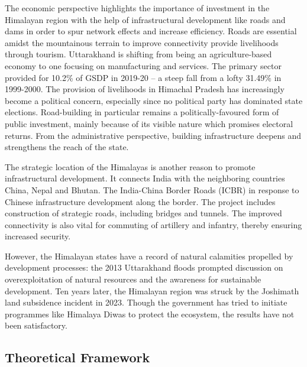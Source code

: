 \documentclass[doublespace,times,Afour,review]{template/sagej}
\begin{document}
The economic perspective highlights the importance of investment in the Himalayan region with the help of infrastructural development like roads and dams in order to spur network effects and increase efficiency. Roads are essential amidst the mountainous terrain to improve connectivity provide livelihoods through tourism. Uttarakhand is shifting from being an agriculture-based economy to one focusing on manufacturing and services. The primary sector provided for 10.2\% of GSDP in 2019-20 – a steep fall from a lofty 31.49\% in 1999-2000. The provision of livelihoods in Himachal Pradesh has increasingly become a political concern, especially since no political party has dominated state elections. Road-building in particular remains a politically-favoured form of public investment, mainly because of its visible nature which promises electoral returns. From the administrative perspective, building infrastructure deepens and strengthens the reach of the state. 

The strategic location of the Himalayas is another reason to promote infrastructural development. It connects India with the neighboring countries China, Nepal and Bhutan. The India-China Border Roads (ICBR) in response to Chinese infrastructure development along the border. The project includes construction of strategic roads, including bridges and tunnels. The improved connectivity is also vital for commuting of artillery and infantry, thereby ensuring increased security.

However, the Himalayan states have a record of natural calamities propelled by development processes: the 2013 Uttarakhand floods prompted discussion on overexploitation of natural resources and the awareness for sustainable development. Ten years later, the Himalayan region was struck by the Joshimath land subsidence incident in 2023. Though the government has tried to initiate programmes like Himalaya Diwas to protect the ecosystem, the results have not been satisfactory.

\subsection{Theoretical Framework}
\end{document}
